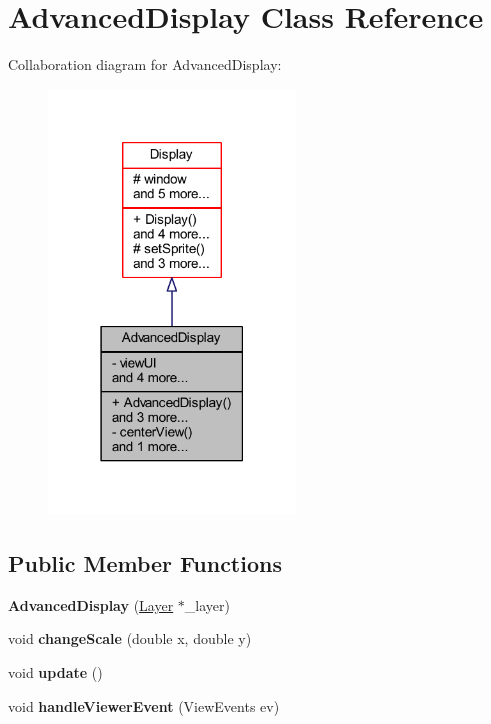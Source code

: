 \hypertarget{class_advanced_display}{}\section{Advanced\+Display Class Reference}
\label{class_advanced_display}


Collaboration diagram for Advanced\+Display\+:\nopagebreak
\begin{figure}[H]
\begin{center}
\leavevmode
\includegraphics[width=186pt]{class_advanced_display__coll__graph}
\end{center}
\end{figure}
\subsection*{Public Member Functions}
\begin{DoxyCompactItemize}
\item 
\mbox{\label{class_advanced_display_a12f2ccc1e24ed1d6d9a68cea1447166f}} 
{\bfseries Advanced\+Display} (\hyperlink{class_layer}{Layer} $\ast$\+\_\+layer)
\item 
\mbox{\label{class_advanced_display_a67925105fd118bb0baf2c92bf13e46c3}} 
void {\bfseries change\+Scale} (double x, double y)
\item 
\mbox{\label{class_advanced_display_a8f1a3ff301cf6261d6c40296d9a926f8}} 
void {\bfseries update} ()
\item 
\mbox{\label{class_advanced_display_ae7ce015fcaf05f4a34c123bff64ebb2e}} 
void {\bfseries handle\+Viewer\+Event} (View\+Events ev)
\end{DoxyCompactItemize}
